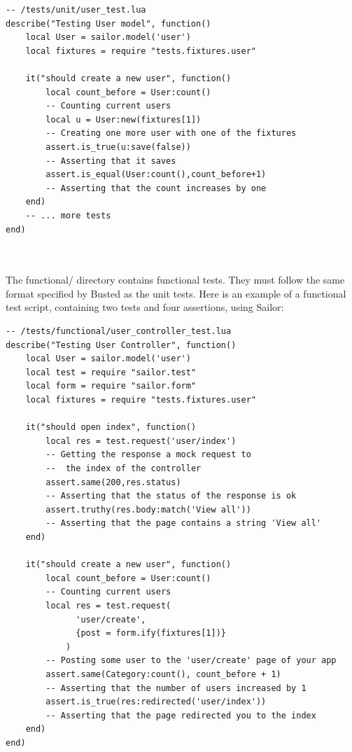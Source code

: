 \documentclass{article}
\begin{document}
\begin{lstlisting}[frame=single]
 -- /tests/unit/user_test.lua 
describe("Testing User model", function()
    local User = sailor.model('user')
    local fixtures = require "tests.fixtures.user"     

    it("should create a new user", function()
        local count_before = User:count() 
        -- Counting current users
        local u = User:new(fixtures[1])   
        -- Creating one more user with one of the fixtures
        assert.is_true(u:save(false))    
        -- Asserting that it saves
        assert.is_equal(User:count(),count_before+1)
        -- Asserting that the count increases by one
    end)
    -- ... more tests
end)
\end{lstlisting}\\\\

The functional/ directory contains functional tests. They must follow the same format specified by Busted as the unit tests. Here is an example of a functional test script, containing two tests and four assertions, using Sailor:\\

\begin{lstlisting}[frame=single]
-- /tests/functional/user_controller_test.lua 
describe("Testing User Controller", function()
    local User = sailor.model('user')
    local test = require "sailor.test"
    local form = require "sailor.form"
    local fixtures = require "tests.fixtures.user"

    it("should open index", function()
        local res = test.request('user/index') 
        -- Getting the response a mock request to 
        --  the index of the controller
        assert.same(200,res.status)       
        -- Asserting that the status of the response is ok
        assert.truthy(res.body:match('View all'))  
        -- Asserting that the page contains a string 'View all'
    end)

    it("should create a new user", function()
        local count_before = User:count()    
        -- Counting current users
        local res = test.request(
        	  'user/create', 
        	  {post = form.ify(fixtures[1])}
        	) 
        -- Posting some user to the 'user/create' page of your app
        assert.same(Category:count(), count_before + 1)   
        -- Asserting that the number of users increased by 1
        assert.is_true(res:redirected('user/index'))  
        -- Asserting that the page redirected you to the index
    end)
end)
\end{lstlisting}\\
\end{document}
